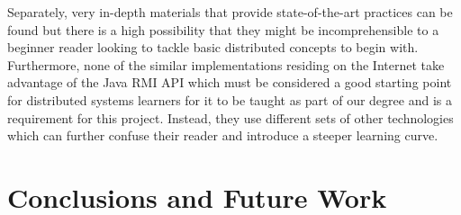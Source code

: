 \documentclass[conference]{IEEEtran}
\begin{document}
Separately, very in-depth materials that provide state-of-the-art practices can 
be found \cite{DBLP:conf/nsdi/BharambePS06} but there is a high possibility that they might be incomprehensible 
to a beginner reader looking to tackle basic distributed concepts to begin with. 
Furthermore, none of the similar implementations residing on the Internet take advantage 
of the Java RMI API which must be considered a good starting point for distributed systems
learners for it to be taught as part of our degree and is a requirement for this
project. Instead, they use different sets of other technologies which can
further confuse their reader and introduce a steeper learning curve.

\section{Conclusions and Future Work}





\end{document}

